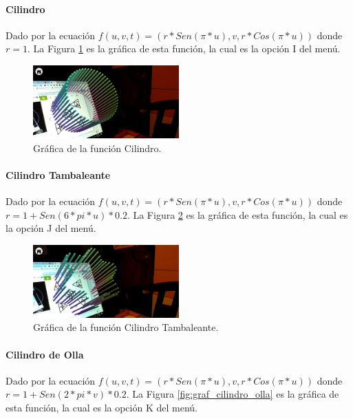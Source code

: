 \paragraph{Cilindro}
Dado por la ecuación $f(u,v,t)=(r*Sen(\pi * u), v, r*Cos(\pi * u))$ donde $r = 1$. La Figura \ref{fig:graf_cilindro} es la gráfica de esta función, la cual es la opción I del menú.

\begin{figure}[hbt!]
\centering
\includegraphics[width=0.5\textwidth]{figuras/graficas/cilindro.png}
\caption{\label{fig:graf_cilindro}Gráfica de la función Cilindro.}
\end{figure}
\FloatBarrier

\paragraph{Cilindro Tambaleante}
Dado por la ecuación $f(u,v,t)=(r*Sen(\pi * u), v, r*Cos(\pi * u))$ donde $r = 1 + Sen(6 * pi * u) * 0.2$. La Figura \ref{fig:graf_cilindro_tambaleante} es la gráfica de esta función, la cual es la opción J del menú.

\begin{figure}[hbt!]
\centering
\includegraphics[width=0.5\textwidth]{figuras/graficas/cilindro_tambaleante.png}
\caption{\label{fig:graf_cilindro_tambaleante}Gráfica de la función Cilindro Tambaleante.}
\end{figure}
\FloatBarrier

\paragraph{Cilindro de Olla}
Dado por la ecuación $f(u,v,t)=(r*Sen(\pi * u), v, r*Cos(\pi * u))$ donde $r = 1 + Sen(2 * pi * v) * 0.2$. La Figura \ref{fig:graf_cilindro_olla} es la gráfica de esta función, la cual es la opción K del menú.


